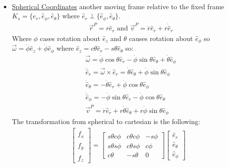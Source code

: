 \documentclass[conference]{IEEEtran}
\begin{document}
\begin{itemize}
\begin{align*}
    \end{align*}
    \item \underline{Spherical Coordinates} another moving frame relative to the fixed frame $K_s = \{\hat{e}_r, \hat{e}_\phi, \hat{e}_\theta\}$ where $\hat{e}_r \perp \{\hat{e}_\phi, \hat{e}_{\theta}\}$.
    \begin{align*}
     & \vec{r}^P = r \hat{e}_r \text{ and } \vec{v}^P = \dot{r} \hat{e}_r + r \dot{\hat{e}}_r
    \end{align*}
    Where $\phi$ cases rotation about $\hat{e}_z$ and $\theta$ causes rotation about $\hat{e}_\phi$ so $\vec{\omega} = \dot{\phi} \hat{e}_z + \dot{\phi} \hat{e}_\phi$ where $\hat{e}_z = c\theta \hat{e}_r - s\theta \hat{e}_\theta$ so:
    \begin{align*}
     & \vec{\omega} = \dot{\phi}\cos\theta \hat{e}_r - \dot{\phi}\sin\theta\hat{e}_\theta + \dot{\theta} \hat{e}_\phi \\
     & \dot{\hat{e}}_r = \vec{\omega} \times \hat{e}_r = \dot{\theta} \hat{e}_\theta + \dot{\phi} \sin\theta \hat{e}_\phi \\
     & \dot{\hat{e}}_\theta = - \dot{\theta} \hat{e}_r + \dot{\phi} \cos\theta \hat{e}_\phi \\
     & \dot{\hat{e}}_\phi = - \dot{\phi} \sin \theta \hat{e}_r - \dot{\phi} \cos \theta \hat{e}_\theta \\
     & \vec{v}^P = \dot{r} \hat{e}_r + r \dot{\theta} \hat{e}_\theta + r \dot{\phi} \sin \theta \hat{e}_\phi
    \end{align*}
    The transformation from spherical to cartesian is the following:
    \begin{align*}
     \begin{bmatrix} \hat{f}_x \\ \hat{f}_y \\ \hat{f}_z \end{bmatrix} = \begin{bmatrix} s\theta c\phi & c\theta c\phi & -s\phi \\ s\theta s\phi & c\theta s\phi & c\phi \\ c\theta & -s\theta & 0 \end{bmatrix}\begin{bmatrix} \hat{e}_r \\ \hat{e}_\theta \\ \hat{e}_\phi \end{bmatrix}
    \end{align*}
 \end{itemize}
\end{document}

